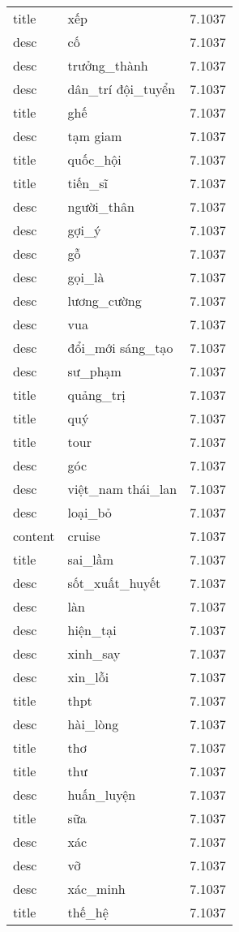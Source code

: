 \documentclass{article}
\begin{document}
\begin{tabular}{lll}
title & xếp & 7.1037\\
desc & cố & 7.1037\\
desc & trưởng\_thành & 7.1037\\
desc & dân\_trí đội\_tuyển & 7.1037\\
title & ghế & 7.1037\\
desc & tạm giam & 7.1037\\
title & quốc\_hội & 7.1037\\
title & tiến\_sĩ & 7.1037\\
desc & người\_thân & 7.1037\\
desc & gợi\_ý & 7.1037\\
desc & gỗ & 7.1037\\
desc & gọi\_là & 7.1037\\
desc & lương\_cường & 7.1037\\
desc & vua & 7.1037\\
desc & đổi\_mới sáng\_tạo & 7.1037\\
desc & sư\_phạm & 7.1037\\
title & quảng\_trị & 7.1037\\
title & quý & 7.1037\\
title & tour & 7.1037\\
desc & góc & 7.1037\\
desc & việt\_nam thái\_lan & 7.1037\\
desc & loại\_bỏ & 7.1037\\
content & cruise & 7.1037\\
title & sai\_lầm & 7.1037\\
desc & sốt\_xuất\_huyết & 7.1037\\
desc & làn & 7.1037\\
desc & hiện\_tại & 7.1037\\
desc & xinh\_say & 7.1037\\
desc & xin\_lỗi & 7.1037\\
title & thpt & 7.1037\\
desc & hài\_lòng & 7.1037\\
title & thơ & 7.1037\\
title & thư & 7.1037\\
desc & huấn\_luyện & 7.1037\\
title & sữa & 7.1037\\
desc & xác & 7.1037\\
desc & vỡ & 7.1037\\
desc & xác\_minh & 7.1037\\
title & thế\_hệ & 7.1037\\

\end{tabular}
\end{document}
